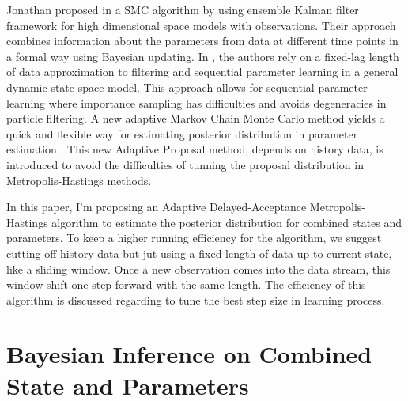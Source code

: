 Jonathan proposed in \cite{stroud2016bayesian} a SMC algorithm by using ensemble Kalman filter framework for high dimensional space models with observations. Their approach combines information about the parameters from data at different time points in a formal way using Bayesian updating. In \cite{polson2008practical}, the authors rely on a fixed-lag length of data approximation to filtering and sequential parameter learning in a general dynamic state space model. This approach allows for sequential parameter learning where importance sampling has difficulties and avoids degeneracies in particle filtering. A new adaptive Markov Chain Monte Carlo method yields a quick and flexible way for estimating posterior distribution in parameter estimation \cite{haario1999adaptive}. This new Adaptive Proposal method, depends on history data, is introduced to avoid the difficulties of tunning the proposal distribution in Metropolis-Hastings methods. 



In this paper, I'm proposing an Adaptive Delayed-Acceptance Metropolis-Hastings algorithm to estimate the posterior distribution for combined states and parameters. To keep a higher running efficiency for the algorithm, we suggest cutting off history data but jut using a fixed length of data up to current state, like a sliding window. Once a new observation comes into the data stream, this window shift one step forward with the same length. The efficiency of this algorithm is discussed regarding to tune the best step size in learning process. 

%



\section{Bayesian Inference on Combined State and Parameters}


